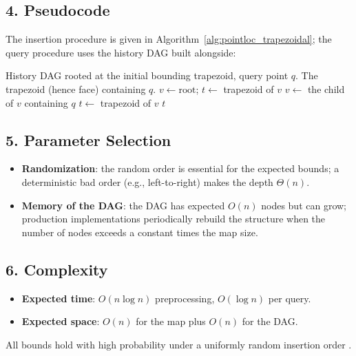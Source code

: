\subsection{4. Pseudocode}

The insertion procedure is given in Algorithm~\ref{alg:pointloc_trapezoidal};
the query procedure uses the history DAG built alongside:

\begin{algorithm}[htbp]
\caption{Query by History DAG}
\label{alg:pointloc_query_dag}
\begin{algorithmic}[1]
\Require History DAG rooted at the initial bounding trapezoid, query point $q$.
\Ensure The trapezoid (hence face) containing $q$.
  \State $v \gets \text{root}$; $t \gets$ trapezoid of $v$
    \State $v \gets$ the child of $v$ containing $q$
    \State $t \gets$ trapezoid of $v$
  \EndWhile
  \State \Return $t$
\EndFunction
\end{algorithmic}
\end{algorithm}

\subsection{5. Parameter Selection}

\begin{itemize}
\item \textbf{Randomization}: the random order is essential for the
  expected bounds; a deterministic bad order (e.g., left-to-right) makes
  the depth $\Theta(n)$.
\item \textbf{Memory of the DAG}: the DAG has expected $O(n)$ nodes but can
  grow; production implementations periodically rebuild the structure when
  the number of nodes exceeds a constant times the map size.
\end{itemize}

\subsection{6. Complexity}

\begin{itemize}
\item \textbf{Expected time}: $O(n \log n)$ preprocessing, $O(\log n)$ per
  query.
\item \textbf{Expected space}: $O(n)$ for the map plus $O(n)$ for the DAG.
\end{itemize}
All bounds hold with high probability under a uniformly random insertion
order \cite{seidel1991}.

